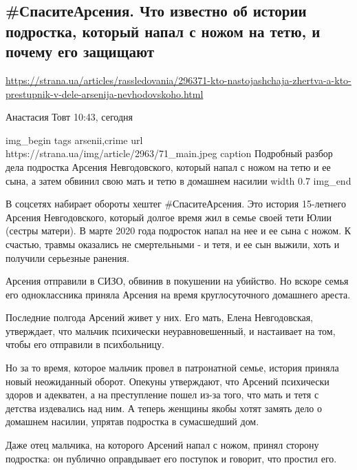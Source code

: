  
 

\subsection{#СпаситеАрсения. Что известно об истории подростка, который напал с ножом на тетю, и почему его защищают}

\url{https://strana.ua/articles/rassledovania/296371-kto-nastojashchaja-zhertva-a-kto-prestupnik-v-dele-arsenija-nevhodovskoho.html}

Анастасия Товт 10:43, сегодня 

\ifcmt
img_begin 
	tags arsenii,crime
	url https://strana.ua/img/article/2963/71_main.jpeg
	caption Подробный разбор дела подростка Арсения Невгодовского, который напал с ножом на тетю и ее сына, а затем обвинил свою мать и тетю в домашнем насилии 
	width 0.7
img_end
\fi

В соцсетях набирает обороты хештег #СпаситеАрсения. Это история 15-летнего
Арсения Невгодовского, который долгое время жил в семье своей тети Юлии
(сестры матери). В марте 2020 года подросток напал на нее и ее сына с ножом. К
счастью, травмы оказались не смертельными - и тетя, и ее сын выжили, хоть и
получили серьезные ранения. 

Арсения отправили в СИЗО, обвинив в покушении на убийство. Но вскоре семья его
одноклассника приняла Арсения на время круглосуточного домашнего ареста.

Последние полгода Арсений живет у них. Его мать, Елена Невгодовская,
утверждает, что мальчик психически неуравновешенный, и настаивает на том, чтобы
его отправили в психбольницу. 

Но за то время, которое мальчик провел в патронатной семье, история приняла
новый неожиданный оборот. Опекуны утверждают, что Арсений психически здоров и
адекватен, а на преступление пошел из-за того, что мать и тетя с детства
издевались над ним. А теперь женщины якобы хотят замять дело о домашнем
насилии, упрятав подростка в сумасшедший дом. 

Даже отец мальчика, на которого Арсений напал с ножом, принял сторону
подростка: он публично оправдывает его поступок и говорит, что простил его.

